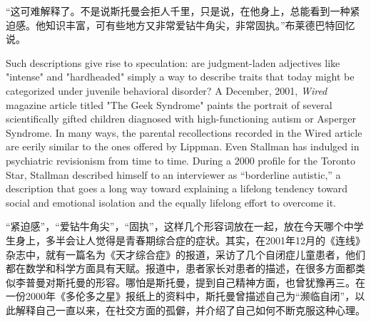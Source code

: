 \ifdefined\chs
``这可难解释了。不是说斯托曼会拒人千里，只是说，在他身上，总能看到一种紧迫感。他知识丰富，可有些地方又非常爱钻牛角尖，非常固执。''布莱德巴特回忆说。
\fi

\ifdefined\eng
Such descriptions give rise to speculation: are judgment-laden adjectives like "intense" and "hardheaded" simply a way to describe traits that today might be categorized under juvenile behavioral disorder? A December, 2001, \textit{Wired} magazine article titled "The Geek Syndrome" paints the portrait of several scientifically gifted children diagnosed with high-functioning autism or Asperger Syndrome. In many ways, the parental recollections recorded in the Wired article are eerily similar to the ones offered by Lippman. Even Stallman has indulged in psychiatric revisionism from time to time. During a 2000 profile for the Toronto Star, Stallman described himself to an interviewer as ``borderline autistic,'' a description that goes a long way toward explaining a lifelong tendency toward social and emotional isolation and the equally lifelong effort to overcome it.

\fi

\ifdefined\chs
``紧迫感''，``爱钻牛角尖''，``固执''，这样几个形容词放在一起，放在今天哪个中学生身上，多半会让人觉得是青春期综合症的症状。其实，在2001年12月的《连线》杂志中，就有一篇名为《天才综合症》的报道，采访了几个自闭症儿童患者，他们都在数学和科学方面具有天赋。报道中，患者家长对患者的描述，在很多方面都类似李普曼对斯托曼的形容。哪怕是斯托曼，提到自己精神方面，也曾犹豫再三。在一份2000年《多伦多之星》报纸上的资料中，斯托曼曾描述自己为``濒临自闭''，以此解释自己一直以来，在社交方面的孤僻，并介绍了自己如何不断克服这种心理。
\fi

